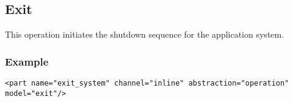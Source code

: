 %
%
%
%
%
%

\subsection{Exit}
\label{exit_heading}

This operation initiates the shutdown sequence for the application system.

\subsubsection{Example}

\begin{scriptsize}
    \begin{verbatim}
<part name="exit_system" channel="inline" abstraction="operation" model="exit"/>
    \end{verbatim}
\end{scriptsize}
